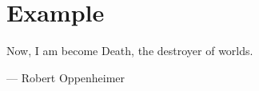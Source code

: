 {\justifying
	\chapter{Example}
	\epigraph{Now, I am become Death, the destroyer of worlds.}{--- \textup{Robert Oppenheimer}}
	\begin{theorem}{}{}
	\end{theorem}
}\cleanalldata